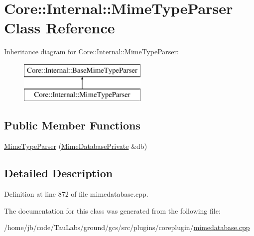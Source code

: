 \hypertarget{class_core_1_1_internal_1_1_mime_type_parser}{\section{\-Core\-:\-:\-Internal\-:\-:\-Mime\-Type\-Parser \-Class \-Reference}
\label{class_core_1_1_internal_1_1_mime_type_parser}
}
\-Inheritance diagram for \-Core\-:\-:\-Internal\-:\-:\-Mime\-Type\-Parser\-:\begin{figure}[H]
\begin{center}
\leavevmode
\includegraphics[height=2.000000cm]{class_core_1_1_internal_1_1_mime_type_parser}
\end{center}
\end{figure}
\subsection*{\-Public \-Member \-Functions}
\begin{DoxyCompactItemize}
\item 
\hyperlink{group___core_plugin_ga5ba7996bcf637b8a7a1a5bcb4e006cb9}{\-Mime\-Type\-Parser} (\hyperlink{class_core_1_1_mime_database_private}{\-Mime\-Database\-Private} \&db)
\end{DoxyCompactItemize}


\subsection{\-Detailed \-Description}


\-Definition at line 872 of file mimedatabase.\-cpp.



\-The documentation for this class was generated from the following file\-:\begin{DoxyCompactItemize}
\item 
/home/jb/code/\-Tau\-Labs/ground/gcs/src/plugins/coreplugin/\hyperlink{mimedatabase_8cpp}{mimedatabase.\-cpp}\end{DoxyCompactItemize}
